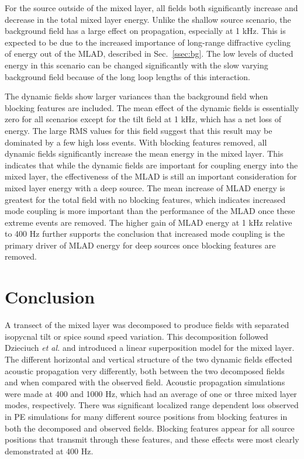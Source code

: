 \documentclass[preprint,NumberedRefs]{JASA}
\begin{document}
For the source outside of the mixed layer, all fields both significantly increase and decrease in the total mixed layer energy. Unlike the shallow source scenario, the background field has a large effect on propagation, especially at 1 kHz. This is expected to be due to the increased importance of long-range diffractive cycling of energy out of the MLAD, described in Sec.~\ref{ssec:bg}. The low levels of ducted energy in this scenario can be changed significantly with the slow varying background field because of the long loop lengths of this interaction.

The dynamic fields show larger variances than the background field when blocking features are included. The mean effect of the dynamic fields is essentially zero for all scenarios except for the tilt field at 1 kHz, which has a net loss of energy. The large RMS values for this field suggest that this result may be dominated by a few high loss events. With blocking features removed, all dynamic fields significantly increase the mean energy in the mixed layer. This indicates that while the dynamic fields are important for coupling energy into the mixed layer, the effectiveness of the MLAD is still an important consideration for mixed layer energy with a deep source. The mean increase of MLAD energy is greatest for the total field with no blocking features, which indicates increased mode coupling is more important than the performance of the MLAD once these extreme events are removed. The higher gain of MLAD energy at 1 kHz relative to 400 Hz further supports the conclusion that increased mode coupling is the primary driver of MLAD energy for deep sources once blocking features are removed.

\section{Conclusion}\label{sec:conclusion}
A transect of the mixed layer was decomposed to produce fields with separated isopycnal tilt or spice sound speed variation. This decomposition followed Dzieciuch \emph{et al.}\citep{dzieciuch2004} and introduced a linear superposition model for the mixed layer. The different horizontal and vertical structure of the two dynamic fields effected acoustic propagation very differently, both between the two decomposed fields and when compared with the observed field. Acoustic propagation simulations were made at 400 and 1000 Hz, which had an average of one or three mixed layer modes, respectively. There was significant localized range dependent loss observed in PE simulations for many different source positions from blocking features in both the decomposed and observed fields. Blocking features appear for all source positions that transmit through these features, and these effects were most clearly demonstrated at 400 Hz.
\end{document}
